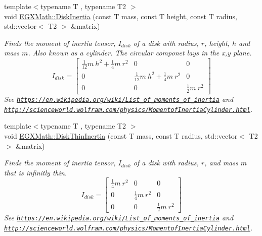 \begin{DoxyCompactItemize}
{\footnotesize template$<$typename T , typename T2 $>$ }\\void \mbox{\hyperlink{group___e_g_x_math-_geometry-3_d-_disk_gad888da52f8bb940380d318a3cac1c048}{E\+G\+X\+Math\+::\+Disk\+Inertia}} (const T mass, const T height, const T radius, std\+::vector$<$ T2 $>$ \&matrix)
\begin{DoxyCompactList}\small\item\em Finds the moment of inertia tensor, $I_{disk}$ of a disk with radius, $r$, height, $h$ and mass $m$. Also known as a cylinder. The circular componet lays in the x,y plane. \[ I_{disk}=\begin{bmatrix} \frac{1}{12}m\ h^2 + \frac{1}{4}m\ r^2 & 0 & 0\\ 0 & \frac{1}{12}m\ h^2 + \frac{1}{4}m\ r^2 & 0\\ 0 & 0 & \frac{1}{2}m\ r^2 \end{bmatrix} \] See \href{https://en.wikipedia.org/wiki/List_of_moments_of_inertia}{\tt https\+://en.\+wikipedia.\+org/wiki/\+List\+\_\+of\+\_\+moments\+\_\+of\+\_\+inertia} and \href{http://scienceworld.wolfram.com/physics/MomentofInertiaCylinder.html}{\tt http\+://scienceworld.\+wolfram.\+com/physics/\+Momentof\+Inertia\+Cylinder.\+html}. \end{DoxyCompactList}\item 
{\footnotesize template$<$typename T , typename T2 $>$ }\\void \mbox{\hyperlink{group___e_g_x_math-_geometry-3_d-_disk_ga99e3f61c70ecd4c99c6f3c59d5ad6a4f}{E\+G\+X\+Math\+::\+Disk\+Thin\+Inertia}} (const T mass, const T radius, std\+::vector$<$ T2 $>$ \&matrix)
\begin{DoxyCompactList}\small\item\em Finds the moment of inertia tensor, $I_{disk}$ of a disk with radius, $r$, and mass $m$ that is infinitly thin. \[ I_{disk}=\begin{bmatrix} \frac{1}{4}m\ r^2 & 0 & 0\\ 0 & \frac{1}{4}m\ r^2 & 0\\ 0 & 0 & \frac{1}{2}m\ r^2 \end{bmatrix} \] See \href{https://en.wikipedia.org/wiki/List_of_moments_of_inertia}{\tt https\+://en.\+wikipedia.\+org/wiki/\+List\+\_\+of\+\_\+moments\+\_\+of\+\_\+inertia} and \href{http://scienceworld.wolfram.com/physics/MomentofInertiaCylinder.html}{\tt http\+://scienceworld.\+wolfram.\+com/physics/\+Momentof\+Inertia\+Cylinder.\+html}. \end{DoxyCompactList}\item 

\end{DoxyCompactItemize}
